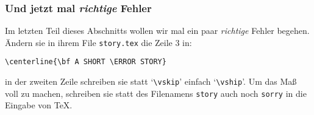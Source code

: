 \subsubsection{Und jetzt mal {\em richtige} Fehler}
Im letzten Teil dieses Abschnitts wollen wir mal ein paar {\em
richtige} Fehler begehen. \"Andern sie in ihrem File {\tt story.tex} die
Zeile 3 in:
\begin{verbatim}
\centerline{\bf A SHORT \ERROR STORY}
\end{verbatim}
in der zweiten Zeile schreiben sie statt
`\verb|\vskip|' einfach
`\verb|\vship|'. Um das Ma\ss{} voll zu machen, schreiben sie statt des
Filenamens {\tt story} auch noch {\tt sorry} in die Eingabe von \TeX.

